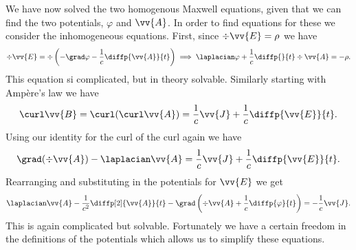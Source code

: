 We have now solved the two homogenous Maxwell equations, given that we can find the two potentials, \(\varphi\) and \(\vv{A}\).
In order to find equations for these we consider the inhomogeneous equations.
First, since \(\div\vv{E} = \rho\) we have
\begin{equation}\label{eqn:scalar potential general}
    \div\vv{E} = \div\left( -\grad\varphi - \frac{1}{c} \diffp{\vv{A}}{t} \right) \implies \laplacian\varphi + \frac{1}{c}\diffp{}{t}\div\vv{A} = -\rho.
\end{equation}
This equation si complicated, but in theory solvable.
Similarly starting with Amp\`ere's law we have
\begin{equation}
    \curl\vv{B}= \curl(\curl \vv{A}) = \frac{1}{c}\vv{J} + \frac{1}{c}\diffp{\vv{E}}{t}.
\end{equation}
Using our identity for the curl of the curl again we have
\begin{equation}
    \grad(\div\vv{A}) - \laplacian\vv{A} = \frac{1}{c}\vv{J} + \frac{1}{c}\diffp{\vv{E}}{t}.
\end{equation}
Rearranging and substituting in the potentials for \(\vv{E}\) we get
\begin{equation}\label{eqn:vector potential general}
    \laplacian\vv{A} - \frac{1}{c^2}\diffp[2]{\vv{A}}{t} - \grad\left( \div\vv{A} + \frac{1}{c}\diffp{\varphi}{t} \right) = -\frac{1}{c}\vv{J}.
\end{equation}
This is again complicated but solvable.
Fortunately we have a certain freedom in the definitions of the potentials which allows us to simplify these equations.

